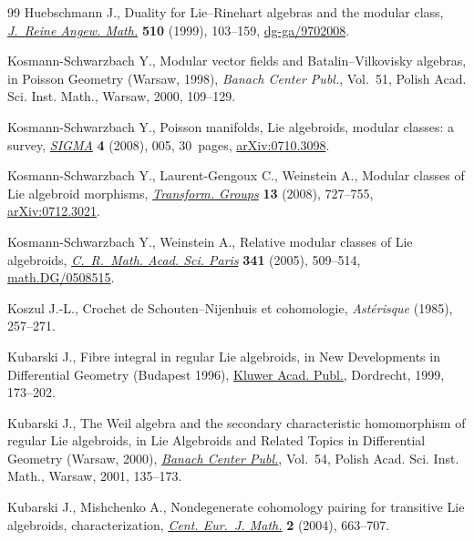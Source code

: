 \documentclass[11pt]{article}
\numberwithin{equation}{section}
\newcommand{\8}{\infty}
\begin{document}
\begin{thebibliography}{99}
Huebschmann J., Duality for {L}ie--{R}inehart algebras and the modular class,
 \href{https://doi.org/10.1515/crll.1999.043}{\textit{J.~Reine Angew. Math.}} \textbf{510} (1999), 103--159,
 \href{https://arxiv.org/abs/dg-ga/9702008}{dg-ga/9702008}.

Kosmann-Schwarzbach Y., Modular vector fields and {B}atalin--{V}ilkovisky
 algebras, in Poisson Geometry ({W}arsaw, 1998), \textit{Banach Center Publ.},
 Vol.~51, Polish Acad. Sci. Inst. Math., Warsaw, 2000, 109--129.

Kosmann-Schwarzbach Y., Poisson manifolds, {L}ie algebroids, modular classes: a
 survey, \href{https://doi.org/10.3842/SIGMA.2008.005}{\textit{SIGMA}} \textbf{4} (2008), 005, 30~pages, \href{https://arxiv.org/abs/0710.3098}{arXiv:0710.3098}.

Kosmann-Schwarzbach Y., Laurent-Gengoux C., Weinstein A., Modular classes of
 {L}ie algebroid morphisms, \href{https://doi.org/10.1007/s00031-008-9032-y}{\textit{Transform. Groups}} \textbf{13} (2008),
 727--755, \href{https://arxiv.org/abs/0712.3021}{arXiv:0712.3021}.

Kosmann-Schwarzbach Y., Weinstein A., Relative modular classes of {L}ie
 algebroids, \href{https://doi.org/10.1016/j.crma.2005.09.010}{\textit{C.~R.~Math. Acad. Sci. Paris}} \textbf{341} (2005),
 509--514, \href{https://arxiv.org/abs/math.DG/0508515}{math.DG/0508515}.

Koszul J.-L., Crochet de {S}chouten--{N}ijenhuis et cohomologie,
 \textit{Ast\'{e}risque} (1985), 257--271.

Kubarski J., Fibre integral in regular {L}ie algebroids, in New Developments in
 Differential Geometry ({B}udapest 1996), \href{https://doi.org/10.1007/978-94-011-5276-1_12}{Kluwer Acad. Publ.}, Dordrecht, 1999,
 173--202.

Kubarski J., The {W}eil algebra and the secondary characteristic homomorphism
 of regular {L}ie algebroids, in Lie Algebroids and Related Topics in
 Differential Geometry ({W}arsaw, 2000), \href{https://doi.org/10.4064/bc54-0-9}{\textit{Banach Center Publ.}},
 Vol.~54, Polish Acad. Sci. Inst. Math., Warsaw, 2001, 135--173.

Kubarski J., Mishchenko A., Nondegenerate cohomology pairing for transitive
 {L}ie algebroids, characterization, \href{https://doi.org/10.2478/BF02475971}{\textit{Cent. Eur.~J. Math.}} \textbf{2}
 (2004), 663--707.


\end{thebibliography}
\end{document}
